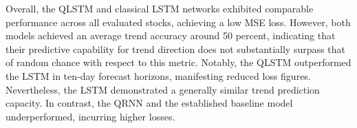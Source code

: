 Overall, the QLSTM and classical LSTM networks exhibited comparable performance across all evaluated stocks, achieving a low MSE loss. However, both models achieved an average trend accuracy around 50 percent, indicating that their predictive capability for trend direction does not substantially surpass that of random chance with respect to this metric. Notably, the QLSTM outperformed the LSTM in ten-day forecast horizons, manifesting reduced loss figures. Nevertheless, the LSTM demonstrated a generally similar trend prediction capacity. In contrast, the QRNN and the established baseline model underperformed, incurring higher losses.

